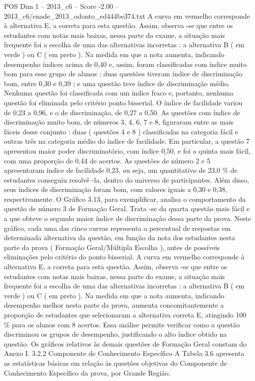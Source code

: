 \begin{textsample}{POS Dim 1 – 2013\_c6 – Score -2.00 – 2013\_c6/enade\_2013\_odonto\_ed444be374.txt}
A curva em vermelho corresponde à alternativa E, a correta para esta questão.
Assim, observa -se que entre os estudantes com notas mais baixas, nessa parte do exame, a situação mais frequente foi a escolha de uma das alternativas incorretas : a alternativa B ( em verde ) ou C ( em preto ).
Na medida em que a nota aumenta, indicando desempenho índices acima de 0,40 e, assim, foram classificadas com índice muito bom para esse grupo de alunos ; duas questões tiveram índice de discriminação bom, entre 0,30 e 0,39 ; e uma questão teve índice de discriminação médio.
Nenhuma questão foi classificada com um índice fraco e, portanto, nenhuma questão foi eliminada pelo critério ponto bisserial.
O índice de facilidade variou de 0,23 a 0,96, e o de discriminação, de 0,27 a 0,50.
As questões com índice de discriminação muito bom, de números 3, 4, 6, 7 e 8, figuraram entre as mais fáceis desse conjunto : duas ( questões 4 e 8 ) classificadas na categoria fácil e outras três na categoria médio do índice de facilidade.
Em particular, a questão 7 apresentou maior poder discriminatório, com índice 0,50, e foi a quinta mais fácil, com uma proporção de 0,44 de acertos.
As questões de número 2 e 5 apresentaram índice de facilidade 0,23, ou seja, um quantitativo de 23,0 \% de estudantes conseguiu resolvê -la, dentro do universo de participantes.
Além disso, seus índices de discriminação foram bom, com valores iguais a 0,30 e 0,38, respectivamente.
O Gráfico 3.13, para exemplificar, analisa o comportamento da questão de número 3 de Formação Geral.
Trata -se da quarta questão mais fácil e a que obteve o segundo maior índice de discriminação dessa parte da prova.
Neste gráfico, cada uma das cinco curvas representa o percentual de respostas em determinada alternativa da questão, em função da nota dos estudantes nesta parte da prova ( Formação Geral/Múltipla Escolha ), antes de possíveis eliminações pelo critério do ponto bisserial.
A curva em vermelho corresponde à alternativa E, a correta para esta questão.
Assim, observa -se que entre os estudantes com notas mais baixas, nessa parte do exame, a situação mais frequente foi a escolha de uma das alternativas incorretas : a alternativa B ( em verde ) ou C ( em preto ).
Na medida em que a nota aumenta, indicando desempenho melhor nesta parte da prova, aumenta concomitantemente a proporção de estudantes que selecionaram a alternativa correta E, atingindo 100 \% para os alunos com 8 acertos.
Essa análise permite verificar como a questão discriminou os grupos de desempenho, justificando o alto índice obtido na questão.
Os gráficos relativos às demais questões de Formação Geral constam do Anexo I. 3.2.2 Componente de Conhecimento Específico A Tabela 3.6 apresenta as estatísticas básicas em relação às questões objetivas do Componente de Conhecimento Específico da prova, por Grande Região.

\end{textsample}
